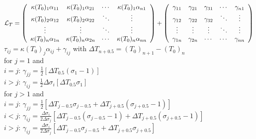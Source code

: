 ${\cal L}_{T}
=  {\left(\begin{array}{*{4}{c}}
\kappa (T_0)_1 \alpha_{11}&\kappa (T_0)_1 \alpha_{21}&\cdots&\kappa (T_0)_1 \alpha_{n1} \\
\kappa (T_0)_2 \alpha_{12}&\kappa (T_0)_2 \alpha_{22}&\ddots&   \vdots \\
            \vdots   & \vdots   & \ddots & \vdots   \\
\kappa (T_0)_n \alpha_{1n}&\kappa (T_0)_n \alpha_{2n}&\cdots&\kappa (T_0)_n \alpha_{nn}    \\
            \end{array}
            \right)}
+ {\left(\begin{array}{*{5}{c}}
            \gamma_{11}   &\gamma_{21}& \gamma_{31} & \cdots & \gamma_{n1}  \\
            \gamma_{12}   &\gamma_{22}& \gamma_{32} & \ddots & \vdots   \\
            \vdots      & \vdots  & \vdots    & \ddots & \vdots   \\
            \gamma_{1n} & \gamma_{2n} & \cdots    & \cdots & \gamma_{nn} \\
            \end{array}
            \right)} $\\

$ \tau_{ij}=\kappa (T_0)_j \alpha_{ij}+\gamma_{ij}$
with
$ \Delta T_{n+0.5}=(T_0)_{n+1} - (T_0)_{n}$\\

for $j=1$ and\\
$i=j$:  $ \gamma_{jj}=  \frac{1}{2} [\Delta T_{0.5} (\sigma_{1}-1)  ] $ \\

$i>j$: $ \gamma_{ij}= \frac{1}{2} \Delta \sigma_{i} [ \Delta T_{0.5}  \sigma_{1}  ]  $ \\


for $j>1$ and\\
$i=j$:  $ \gamma_{jj}= \frac{1}{2} [\Delta T_{j-0.5} \sigma_{j-0.5}
+ \Delta T_{j+0.5} (\sigma_{j+0.5}-1)  ]  $ \\

$i<j$:  $ \gamma_{ij}= \frac{\Delta \sigma_{i} }{2 \Delta \sigma_{j} } 
[\Delta T_{j-0.5} (\sigma_{j-0.5}-1)
+ \Delta T_{j+0.5}  (\sigma_{j+0.5}-1)  ]   $  \\

$i>j$: $ \gamma_{ij}= \frac{\Delta \sigma_{i}}{2 \Delta \sigma_{j} } 
[\Delta T_{j-0.5}  \sigma_{j-0.5}
+ \Delta T_{j+0.5}  \sigma_{j+0.5}  ] $ \\






